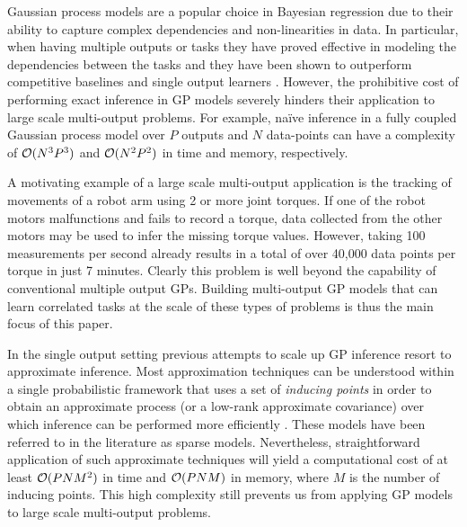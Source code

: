 Gaussian process models  \citep[GPs,][]{rasmussen-williams-book}  are a popular choice in 
Bayesian regression due to their ability to capture complex dependencies and non-linearities in data.
In particular, when having multiple outputs or tasks they have proved effective in modeling 
the dependencies between the tasks  and  they have been shown to outperform competitive baselines and 
single output learners  \citep{bonilla-et-al-nips-08,teh-et-al-aistats-05,alvarez-lawrence-nips-08,wilson-et-al-icml-12}.
However, the prohibitive cost of performing exact inference in  GP models severely hinders 
their application to  large scale multi-output problems. For example, na\"{i}ve inference 
in a fully coupled Gaussian process model over $P$  outputs and $N$ data-points can have 
a complexity of $\mathcal{O}(N^3P^3)$  and $\mathcal{O}(N^2P^2)$ in time and memory, respectively.


A motivating  example of a large scale multi-output application 
is the tracking of  movements of a robot arm using 2 or more joint torques. 
If one of the robot motors malfunctions and fails to record a torque, data collected from the 
other motors may be used to infer the missing torque values.
However, taking 100 measurements per second already results in a total of over 40,000 data points 
per torque in just 7 minutes.
Clearly this problem is well beyond the capability of conventional multiple output GPs.
Building  multi-output GP models that can learn correlated tasks at the scale of 
these types of problems  is thus the main focus of this paper.

In the single output setting previous attempts to scale up  GP inference 
resort to approximate inference. Most  approximation techniques 
 can be understood 
within a single probabilistic framework that uses a set of \emph{inducing points}  in order to 
obtain an approximate process (or a low-rank approximate covariance) over which inference can be 
performed more efficiently \citep{quinonero2005unifying}. These models have been referred 
to in the literature as sparse models. 
Nevertheless, straightforward application of such approximate techniques will yield a computational 
cost of at least $\mathcal{O}(PNM^2)$ in time and  $\mathcal{O}(PNM)$ in memory, where 
$M$ is the number of inducing points. This high complexity still prevents us from applying GP models 
to  large scale multi-output problems.

